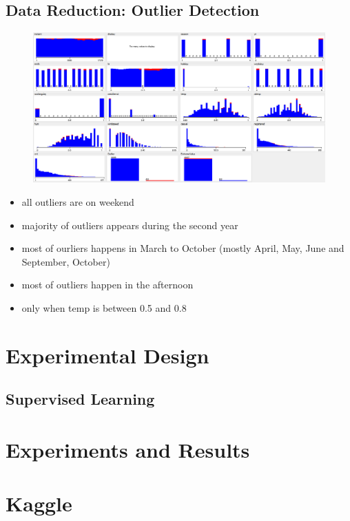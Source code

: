 \documentclass[12pt]{article}
\begin{document}
	\subsection{Data Reduction: Outlier Detection}
	\begin{figure}[H]
		\includegraphics[scale=0.45]{figures/outlier1.png}
	\end{figure}
	\begin{itemize}
		\item all outliers are on weekend
		\item majority of outliers appears during the second year
		\item most of ourliers happens in March to October (mostly April,	May, June and September, October)
		\item most of outliers happen in the afternoon
		\item only when temp is between 0.5 and 0.8
	\end{itemize}
	
	
	
	
	\section{Experimental Design}
	\label{sec:experimental-design}
	
	
	
	\subsection{Supervised Learning}
	\label{supervised learning}
	
	
	\section{Experiments and Results}
	\label{sec:experiments-and-results}
	
	\section{Kaggle}
	
\end{document}
